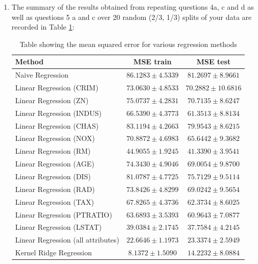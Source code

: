 \documentclass[final,3p,times,12pt]{article}
\begin{document}
\begin{enumerate}
    \item The summary of the results obtained from repeating questions 4a, c and d as well as questions 5 a and c over 20 random (2/3, 1/3) splits of your data are recorded in Table \ref{tab:question_5d}:

    \begin{table}[H]
        \centering
        \begin{tabular}{|l|c|c|}
        \hline
        \textbf{Method} & \textbf{MSE train} & \textbf{MSE test} \\
        \hline
        Naive Regression & $86.1283 \pm 4.5339$ & $81.2697 \pm 8.9661$ \\
        \hline
        Linear Regression (CRIM) & $73.0630 \pm 4.8533$ & $70.2882 \pm 10.6816$ \\
        Linear Regression (ZN) & $75.0737 \pm 4.2831$ & $70.7135 \pm 8.6247$ \\
        Linear Regression (INDUS) & $66.5390 \pm 4.3773$ & $61.3513 \pm 8.8134$ \\
        Linear Regression (CHAS) & $83.1194 \pm 4.2663$ & $79.9543 \pm 8.6215$ \\
        Linear Regression (NOX) & $70.8872 \pm 4.6983$ & $65.6442 \pm 9.3682$ \\
        Linear Regression (RM) & $44.9055 \pm 1.9245$ & $41.3390 \pm    3.9541$ \\
        Linear Regression (AGE) & $74.3430 \pm 4.9046$ & $69.0054 \pm 9.8700$ \\
        Linear Regression (DIS) & $81.0787 \pm 4.7725$ & $75.7129 \pm 9.5114$ \\
        Linear Regression (RAD) & $73.8426 \pm 4.8299$ & $69.0242 \pm 9.5654$ \\
        Linear Regression (TAX) & $67.8265 \pm 4.3736$ & $62.3734 \pm   8.6025$ \\
        Linear Regression (PTRATIO) & $63.6893 \pm 3.5393$ & $60.9643 \pm 7.0877$ \\
        Linear Regression (LSTAT) & $39.0384 \pm 2.1745$ & $37.7584 \pm 4.2145$ \\
        \hline
        Linear Regression (all attributes) & $22.6646 \pm 1.1973$ & $23.3374 \pm 2.5949$ \\
        \hline
        Kernel Ridge Regression & $8.1372 \pm 1.5090$ & $14.2232 \pm    8.0884$ \\
        \hline
        \end{tabular}
    \caption{Table showing the mean squared error for various regression methods}
    \label{tab:question_5d}
    \end{table}

\end{enumerate}
\end{document}
